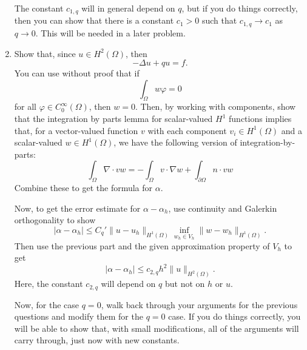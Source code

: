 \documentclass{article}
\theoremstyle{plain}
\theoremstyle{definition}
\theoremstyle{remark}
\begin{document}
\begin{enumerate}
        The constant $c_{1,q}$ will in general depend on $q$, but if you do things correctly, then you can show that there is a constant $c_1 > 0$ such that $c_{1,q} \to c_1$ as $q \to 0$.
        This will be needed in a later problem.

  \item Show that, since $u \in H^2(\Omega)$, then \[-\Delta u + qu = f.\]
        You can use without proof that if \[\int_\Omega w\varphi = 0\] for all $\varphi \in C_0^\infty(\Omega)$, then $w = 0$.
        Then, by working with components, show that the integration by parts lemma for scalar-valued $H^1$ functions implies that, for a vector-valued function $v$ with each component $v_i \in H^1(\Omega)$ and a scalar-valued $w \in H^1(\Omega)$, we have the following version of integration-by-parts: \[\int_\Omega \nabla \cdot  v w = -\int_\Omega v \cdot \nabla w + \int_{\partial \Omega} n \cdot v w\]
        Combine these to get the formula for $\alpha$.

        Now, to get the error estimate for $\alpha - \alpha_h$, use continuity and Galerkin orthogonality to show \[|\alpha - \alpha_h| \leq C_q'\|u-u_h\|_{H^1(\Omega)}\inf_{w_h\in V_h}\|w-w_h\|_{H^1(\Omega)}.\]
        Then use the previous part and the given approximation property of $V_h$ to get \[|\alpha - \alpha_h| \leq c_{2,q}h^2\|u\|_{H^2(\Omega)}.\]
        Here, the constant $c_{2,q}$ will depend on $q$ but not on $h$ or $u$.

        Now, for the case $q = 0$, walk back through your arguments for the previous questions and modify them for the $q = 0$ case.
        If you do things correctly, you will be able to show that, with small modifications, all of the arguments will carry through, just now with new constants.
\end{enumerate}
\end{document}
